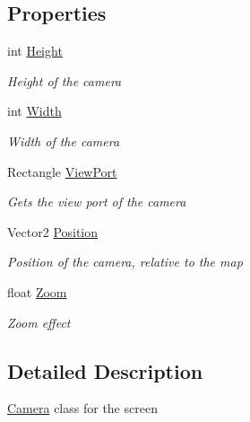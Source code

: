 \subsection*{Properties}
\begin{DoxyCompactItemize}
\item 
int \hyperlink{class_hel_project_1_1_u_i_1_1_camera_af050fd0946ed11d3c997d7fa2a461571}{Height}
\begin{DoxyCompactList}\small\item\em Height of the camera \end{DoxyCompactList}\item 
int \hyperlink{class_hel_project_1_1_u_i_1_1_camera_ad16cc9589cf14533997a8f090c67f509}{Width}
\begin{DoxyCompactList}\small\item\em Width of the camera \end{DoxyCompactList}\item 
Rectangle \hyperlink{class_hel_project_1_1_u_i_1_1_camera_a95599103c122a9b40fb225603788b6ed}{View\+Port}
\begin{DoxyCompactList}\small\item\em Gets the view port of the camera \end{DoxyCompactList}\item 
Vector2 \hyperlink{class_hel_project_1_1_u_i_1_1_camera_abe879707e0bdcebf2e1c9a4e21440876}{Position}
\begin{DoxyCompactList}\small\item\em Position of the camera, relative to the map \end{DoxyCompactList}\item 
float \hyperlink{class_hel_project_1_1_u_i_1_1_camera_a785b2a428a8b4f4401e208a2e1396d42}{Zoom}
\begin{DoxyCompactList}\small\item\em Zoom effect \end{DoxyCompactList}\end{DoxyCompactItemize}


\subsection{Detailed Description}
\hyperlink{class_hel_project_1_1_u_i_1_1_camera}{Camera} class for the screen 



